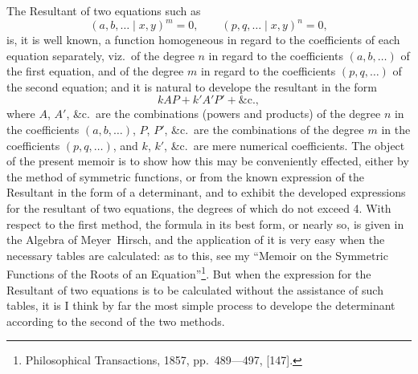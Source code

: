 \documentclass[11pt,a4paper]{book}
\begin{document}
\begin{center}
\normalsize

The Resultant of two equations such as
\[
(a, b, \ldots \mid x, y)^m = 0,
\qquad
(p, q, \ldots \mid x, y)^n = 0,
\]
is, it is well known, a function homogeneous in regard to the coefficients of
each equation separately, viz.\ of the degree $n$ in regard to the
coefficients $(a, b, \ldots)$ of the first equation, and of the degree $m$
in regard to the coefficients $(p, q, \ldots)$ of the second equation; and it
is natural to develope the resultant in the form
\[
kAP + k'A'P' + \&\text{c.},
\]
where $A$, $A'$, \&c.\ are the combinations (powers and products) of the
degree $n$ in the coefficients $(a, b, \ldots)$, $P$, $P'$, \&c.\ are the
combinations of the degree $m$ in the coefficients $(p, q, \ldots)$, and $k$,
$k'$, \&c.\ are mere numerical coefficients. The object of the present memoir
is to show how this may be conveniently effected, either by the method of
symmetric functions, or from the known expression of the Resultant in the form
of a determinant, and to exhibit the developed expressions for the resultant of
two equations, the degrees of which do not exceed 4. With respect to the first
method, the formula in its best form, or nearly so, is given in the Algebra of
Meyer~Hirsch, and the application of it is very easy when the necessary tables
are calculated: as to this, see my ``Memoir on the Symmetric Functions of the
Roots of an Equation''\footnote{Philosophical Transactions, 1857,
pp.~489---497, [147].}. But when the expression for the Resultant of two
equations is to be calculated without the assistance of such tables, it is I
think by far the most simple process to develope the determinant according to
the second of the two methods.


\end{center}
\end{document}
